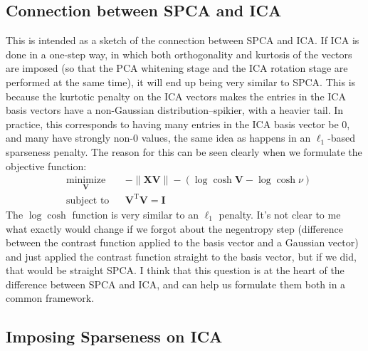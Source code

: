 \documentclass{article}
\newcommand{\transpose}{^\mathrm{T}}
\begin{document}
\subsection*{Connection between SPCA and ICA}
This is intended as a sketch of the connection between SPCA and ICA.  If ICA is done in a one-step way, in which both orthogonality and kurtosis of the vectors are imposed (so that the PCA whitening stage and the ICA rotation stage are performed at the same time), it will end up being very similar to SPCA.  This is because the kurtotic penalty on the ICA vectors makes the entries in the ICA basis vectors have a non-Gaussian distribution--spikier, with a heavier tail.  In practice, this corresponds to having many entries in the ICA basis vector be 0, and many have strongly non-0 values, the same idea as happens in an $\ell_1$-based sparseness penalty.  The reason for this can be seen clearly when we formulate the objective function: 
 \begin{equation}
\begin{aligned}
&\underset{\mathbf{V}}{\text{minimize}} && -\|\mathbf{XV}\| - (\log \cosh \mathbf{V} - \log \cosh \nu)  \\ 
& \text{subject to} & & \mathbf{V}\transpose\mathbf{V} = \mathbf{I}
\end{aligned}
\end{equation}
The $\log \cosh$ function is very similar to an $\ell_1$ penalty.  It's not clear to me what exactly would change if we forgot about the negentropy step (difference between the contrast function applied to the basis vector and a Gaussian vector) and just applied the contrast function straight to the basis vector, but if we did, that would be straight SPCA.  I think that this question is at the heart of the difference between SPCA and ICA, and can help us formulate them both in a common framework. 

\subsection*{Imposing Sparseness on ICA}


\end{document}
